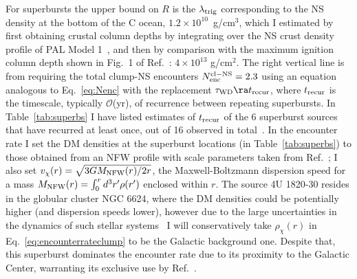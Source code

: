\documentclass[
    twocolumn,
	prd,
        amssymb,
	preprintnumbers,
	secnumarabic,
	nofootinbib,
	superscriptaddress]{revtex4-1}
\begin{document}
For superbursts the upper bound on $R$ is the $\lambda_{\rm trig}$ corresponding to the NS density at the bottom of the C ocean, $1.2\times 10^{10}$~g/cm$^3$, which I estimated by first obtaining crustal column depths by integrating over the NS crust density profile of PAL Model 1~\cite{crustdensityprofileRRIIIA}, and then by comparison with the maximum ignition column depth shown in Fig.~1 of Ref.~\cite{supburst:Cflashes:Cumming:2001wg}: $4 \times 10^{13}$ g/cm$^2$.
The right vertical line is from requiring the total clump-NS encounters $N^{\rm cl-NS}_{\rm enc} = 2.3$ using an equation analogous to Eq.~\eqref{eq:Nenc} with the replacement $\tau_{\rm WD} \ra t_{\rm recur}$, where $t_{\rm recur}$ is the timescale, typically $\mathcal{O}$(yr), of recurrence between repeating superbursts.
In Table~\ref{tab:superbs} I have listed estimates of $t_{\rm recur}$ of the 6 superburst sources that have recurred at least once, out of 16 observed in total~\cite{supburst:catalog2023}. 
In the encounter rate I set the DM densities at the superburst locations (in Table~\ref{tab:superbs}) to those obtained from an NFW profile with scale parameters taken from Ref.~\cite{PPPCookbook:2010xx};
I also set $v_\chi (r) = \sqrt{3 G M_{\rm NFW}(r)/2r}$, the Maxwell-Boltzmann dispersion speed for a mass $M_{\rm NFW}(r) = \int_0^r d^3r^\prime \rho(r^\prime)$ enclosed within $r$.
The source 4U 1820-30 resides in the globular cluster NGC 6624, where the DM densities could be potentially higher (and dispersion speeds lower), however due to the large uncertainties in the dynamics of such stellar systems~\cite{globularGaraniRajReynosoC:2023esk} I will conservatively take $\rho_\chi (r)$ in Eq.~\eqref{eq:encounterrateclump} to be the Galactic background one. 
Despite that, this superburst dominates the encounter rate due to its proximity to the Galactic Center, warranting its exclusive use by Ref.~\cite{MACROSidhu2020}.
\end{document}
